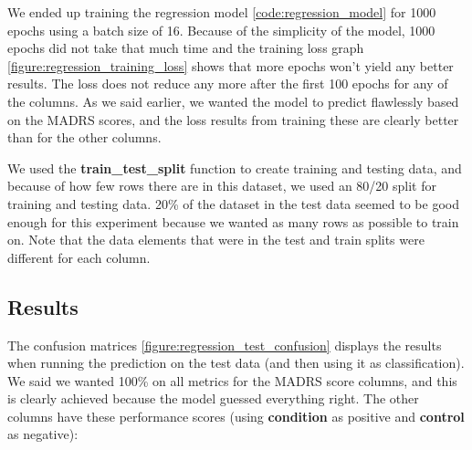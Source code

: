 We ended up training the regression model \ref{code:regression_model} for 1000 epochs using a batch size of 16. Because of the simplicity of the model, 
1000 epochs did not take that much time and the training loss graph \ref{figure:regression_training_loss} shows that more epochs won't yield any better results. 
The loss does not reduce any more after the first 100 epochs for any of the columns. As we said earlier, we wanted the model to predict 
flawlessly based on the MADRS scores, and the loss results from training these are clearly better than for the other columns. 

We used the \textbf{train\_test\_split} function to create training and testing data, and because of how few rows there are in this dataset, 
we used an 80/20 split for training and testing data. 20\% of the dataset in the test data seemed to be good enough for this experiment 
because we wanted as many rows as possible to train on. Note that the data elements that were in the test and train splits were different for each column. 

\subsection{Results}

The confusion matrices \ref{figure:regression_test_confusion} displays the results when running the prediction on the test data (and then using it as classification). 
We said we wanted 100\% on all metrics for the MADRS score columns, and this is clearly achieved because the model guessed everything right. 
The other columns have these performance scores (using \textbf{condition} as positive and \textbf{control} as negative):

